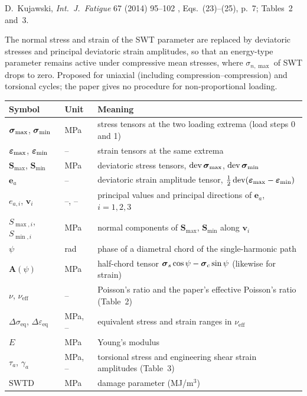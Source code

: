 \label{sheet:SWTD}

 D.~Kujawski, \emph{Int.\ J.\ Fatigue} 67 (2014) 95--102 \cite{kujawski2014},
Eqs.~(23)--(25), p.~7; Tables~2 and~3.

 The normal stress and strain of the SWT parameter are replaced by deviatoric
stresses and principal deviatoric strain amplitudes, so that an energy-type parameter remains
active under compressive mean stresses, where $\sigma_{n,\max}$ of SWT drops to zero. Proposed for
uniaxial (including compression--compression) and torsional cycles; the paper gives no procedure
for non-proportional loading.

\begin{center}\small
\begin{tabular}{@{}llp{100mm}@{}}
\toprule
Symbol & Unit & Meaning\\\midrule
$\boldsymbol\sigma_{\max}$, $\boldsymbol\sigma_{\min}$ & MPa & stress tensors at the two loading extrema (load steps 0 and 1)\\
$\boldsymbol\varepsilon_{\max}$, $\boldsymbol\varepsilon_{\min}$ & -- & strain tensors at the same extrema\\
$\mathbf S_{\max}$, $\mathbf S_{\min}$ & MPa & deviatoric stress tensors, $\operatorname{dev}\boldsymbol\sigma_{\max}$, $\operatorname{dev}\boldsymbol\sigma_{\min}$\\
$\mathbf e_a$ & -- & deviatoric strain amplitude tensor, $\tfrac12\operatorname{dev}(\boldsymbol\varepsilon_{\max}-\boldsymbol\varepsilon_{\min})$\\
$e_{a,i}$, $\mathbf v_i$ & --, -- & principal values and principal directions of $\mathbf e_a$, $i=1,2,3$\\
$S_{\max,i}$, $S_{\min,i}$ & MPa & normal components of $\mathbf S_{\max}$, $\mathbf S_{\min}$ along $\mathbf v_i$\\
$\psi$ & rad & phase of a diametral chord of the single-harmonic path\\
$\mathbf A(\psi)$ & MPa & half-chord tensor $\boldsymbol\sigma_s\cos\psi-\boldsymbol\sigma_c\sin\psi$ (likewise for strain)\\
$\nu$, $\nu_\text{eff}$ & -- & Poisson's ratio and the paper's effective Poisson's ratio (Table~2)\\
$\Delta\sigma_\text{eq}$, $\Delta\varepsilon_\text{eq}$ & MPa, -- & equivalent stress and strain ranges in $\nu_\text{eff}$\\
$E$ & MPa & Young's modulus\\
$\tau_a$, $\gamma_a$ & MPa, -- & torsional stress and engineering shear strain amplitudes (Table~3)\\
$\mathrm{SWTD}$ & MPa & damage parameter (MJ/m$^3$)\\
\bottomrule
\end{tabular}
\end{center}

